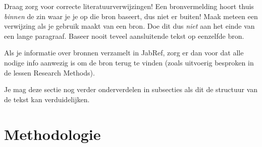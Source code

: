 Draag zorg voor correcte literatuurverwijzingen! Een bronvermelding hoort thuis \emph{binnen} de zin waar je je op die bron baseert, dus niet er buiten! Maak meteen een verwijzing als je gebruik maakt van een bron. Doe dit dus \emph{niet} aan het einde van een lange paragraaf. Baseer nooit teveel aansluitende tekst op eenzelfde bron.

Als je informatie over bronnen verzamelt in JabRef, zorg er dan voor dat alle nodige info aanwezig is om de bron terug te vinden (zoals uitvoerig besproken in de lessen Research Methods).


Je mag deze sectie nog verder onderverdelen in subsecties als dit de structuur van de tekst kan verduidelijken.

\section{Methodologie}%
\label{sec:methodologie}

